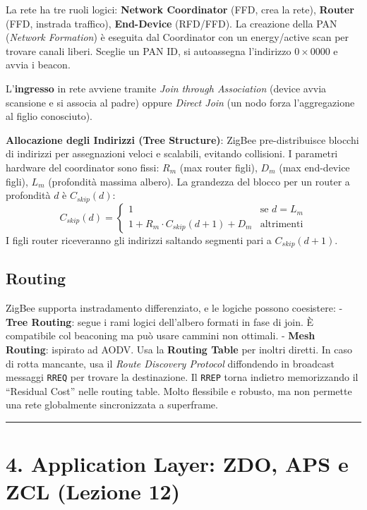 \documentclass[
  italian,
  openany]{book}
\begin{document}
La rete ha tre ruoli logici: \textbf{Network Coordinator} (FFD, crea la
rete), \textbf{Router} (FFD, instrada traffico), \textbf{End-Device}
(RFD/FFD). La creazione della PAN (\emph{Network Formation}) è eseguita
dal Coordinator con un energy/active scan per trovare canali liberi.
Sceglie un PAN ID, si autoassegna l'indirizzo \(0\times0000\) e avvia i
beacon.

L'\textbf{ingresso} in rete avviene tramite \emph{Join through
Association} (device avvia scansione e si associa al padre) oppure
\emph{Direct Join} (un nodo forza l'aggregazione al figlio conosciuto).

\textbf{Allocazione degli Indirizzi (Tree Structure)}: ZigBee
pre-distribuisce blocchi di indirizzi per assegnazioni veloci e
scalabili, evitando collisioni. I parametri hardware del coordinator
sono fissi: \(R_m\) (max router figli), \(D_m\) (max end-device figli),
\(L_m\) (profondità massima albero). La grandezza del blocco per un
router a profondità \(d\) è \(C_{skip}(d)\): \[
C_{skip}(d) = \begin{cases} 1 & \text{se } d = L_m \\ 1 + R_m \cdot C_{skip}(d+1) + D_m & \text{altrimenti} \end{cases}
\] I figli router riceveranno gli indirizzi saltando segmenti pari a
\(C_{skip}(d+1)\).

\subsection{Routing}\label{routing}

ZigBee supporta instradamento differenziato, e le logiche possono
coesistere: - \textbf{Tree Routing}: segue i rami logici dell'albero
formati in fase di join. È compatibile col beaconing ma può usare
cammini non ottimali. - \textbf{Mesh Routing}: ispirato ad AODV. Usa la
\textbf{Routing Table} per inoltri diretti. In caso di rotta mancante,
usa il \emph{Route Discovery Protocol} diffondendo in broadcast messaggi
\texttt{RREQ} per trovare la destinazione. Il \texttt{RREP} torna
indietro memorizzando il ``Residual Cost'' nelle routing table. Molto
flessibile e robusto, ma non permette una rete globalmente sincronizzata
a superframe.

\begin{center}\rule{0.5\linewidth}{0.5pt}\end{center}

\section{4. Application Layer: ZDO, APS e ZCL (Lezione
12)}\label{application-layer-zdo-aps-e-zcl-lezione-12}
\end{document}
